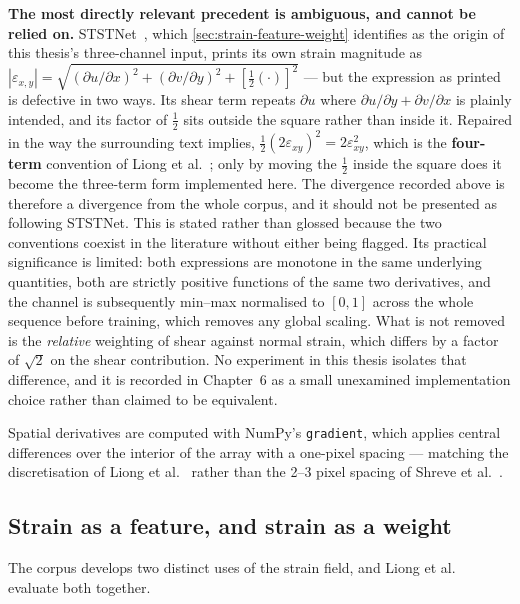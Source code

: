\textbf{The most directly relevant precedent is ambiguous, and cannot be relied on.} STSTNet~\cite{liong2019b}, which \autoref{sec:strain-feature-weight} identifies as the origin of this thesis's three-channel input, prints its own strain magnitude as $|\varepsilon_{x,y}| = \sqrt{(\partial u/\partial x)^2 + (\partial v/\partial y)^2 + [\tfrac{1}{2}(\cdot)]^2}$ --- but the expression as printed is defective in two ways. Its shear term repeats $\partial u$ where $\partial u/\partial y + \partial v/\partial x$ is plainly intended, and its factor of $\tfrac{1}{2}$ sits outside the square rather than inside it. Repaired in the way the surrounding text implies, $\tfrac{1}{2}(2\varepsilon_{xy})^2 = 2\varepsilon_{xy}^2$, which is the \textbf{four-term} convention of Liong et al.~\cite{liong2014a,liong2014b,liong2016}; only by moving the $\tfrac{1}{2}$ inside the square does it become the three-term form implemented here. The divergence recorded above is therefore a divergence from the whole corpus, and it should not be presented as following STSTNet. This is stated rather than glossed because the two conventions coexist in the literature without either being flagged. Its practical significance is limited: both expressions are monotone in the same underlying quantities, both are strictly positive functions of the same two derivatives, and the channel is subsequently min--max normalised to $[0,1]$ across the whole sequence before training, which removes any global scaling. What is not removed is the \textit{relative} weighting of shear against normal strain, which differs by a factor of $\sqrt{2}$ on the shear contribution. No experiment in this thesis isolates that difference, and it is recorded in Chapter~6 as a small unexamined implementation choice rather than claimed to be equivalent.

Spatial derivatives are computed with NumPy's \texttt{gradient}, which applies central differences over the interior of the array with a one-pixel spacing --- matching the discretisation of Liong et al.~\cite{liong2014a} rather than the 2--3 pixel spacing of Shreve et al.~\cite{shreve2011}.

\subsection{Strain as a feature, and strain as a weight}
\label{sec:strain-feature-weight}

The corpus develops two distinct uses of the strain field, and Liong et al.~\cite{liong2016} evaluate both together.

